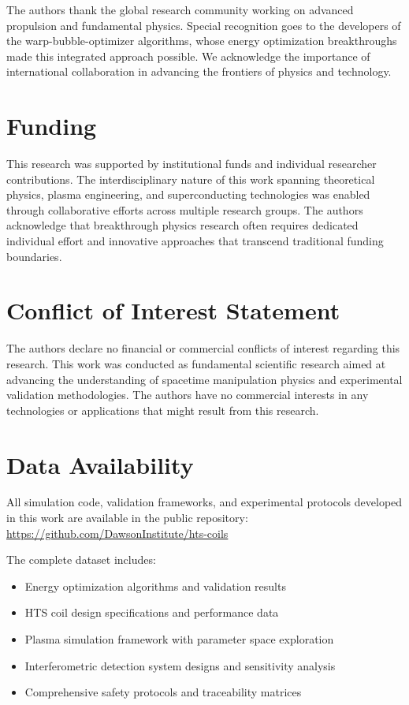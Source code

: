 \documentclass[12pt,a4paper]{article}
\begin{document}
The authors thank the global research community working on advanced propulsion and fundamental physics. Special recognition goes to the developers of the warp-bubble-optimizer algorithms, whose energy optimization breakthroughs made this integrated approach possible. We acknowledge the importance of international collaboration in advancing the frontiers of physics and technology.

\section*{Funding}

This research was supported by institutional funds and individual researcher contributions. The interdisciplinary nature of this work spanning theoretical physics, plasma engineering, and superconducting technologies was enabled through collaborative efforts across multiple research groups. The authors acknowledge that breakthrough physics research often requires dedicated individual effort and innovative approaches that transcend traditional funding boundaries.

\section*{Conflict of Interest Statement}

The authors declare no financial or commercial conflicts of interest regarding this research. This work was conducted as fundamental scientific research aimed at advancing the understanding of spacetime manipulation physics and experimental validation methodologies. The authors have no commercial interests in any technologies or applications that might result from this research.

\section*{Data Availability}

All simulation code, validation frameworks, and experimental protocols developed in this work are available in the public repository: \url{https://github.com/DawsonInstitute/hts-coils}

The complete dataset includes:
\begin{itemize}
\item Energy optimization algorithms and validation results
\item HTS coil design specifications and performance data
\item Plasma simulation framework with parameter space exploration
\item Interferometric detection system designs and sensitivity analysis
\item Comprehensive safety protocols and traceability matrices
\end{itemize}
\end{document}
